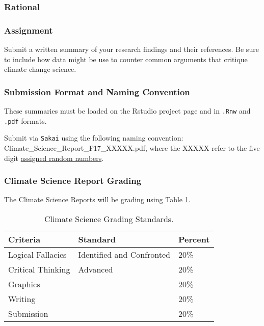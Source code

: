 
\subsubsection{Rational}

\subsubsection{Assignment}



Submit a written summary of your research findings and their references. Be sure to include how data might be use to counter common arguments that critique climate change science. 

\subsubsection{Submission Format and Naming Convention}

These summaries must be loaded on the Rstudio project page and in \texttt{.Rnw} and \texttt{.pdf} formats. 

Submit via \texttt{Sakai} using the following naming convention: Climate\_Science\_Report\_F17\_XXXXX.pdf, where the XXXXX refer to the five digit \href{https://github.com/marclos/Climate_Change_Narratives/raw/master/Admin/RandomNumbers.pdf}{assigned random numbers}.

\subsubsection{Climate Science Report Grading}

The Climate Science Reports will be grading using Table \ref{tab:climatesciencereportgrading}. 

\begin{table}[h]
\caption{Climate Science Grading Standards.}
\label{tab:climatesciencereportgrading}
\begin{tabular}{lll}\hline
Criteria          & Standard      &   Percent \\\hline\hline
Logical Fallacies & Identified and Confronted   & 20\% \\
Critical Thinking & Advanced                    & 20\%\\
Graphics          && 20\%\\
Writing           && 20\% \\
Submission        && 20\% \\
\hline
\end{tabular}
\end{table}

